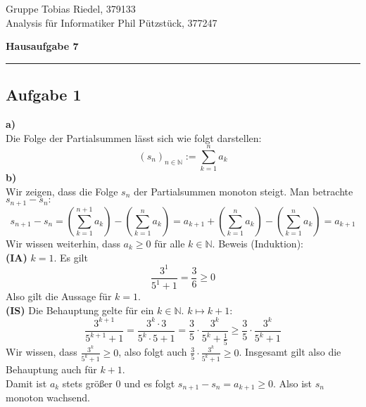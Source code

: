 \documentclass[a4paper,graphics,11pt]{article}
\newcommand{\aufgabe}[1]{\subsection*{Aufgabe #1}}
\begin{document}
\noindent Gruppe              \hfill Tobias Riedel, 379133 \\
\noindent Analysis für Informatiker             \hfill Phil Pützstück, 377247 \\

\begin{center}
	\LARGE{\textbf{Hausaufgabe 7}}
\end{center}
\begin{center}
\rule[0.1ex]{\textwidth}{1pt}
\end{center}



\aufgabe{1}
\textbf{a)}\\[5pt]
Die Folge der Partialsummen lässt sich wie folgt darstellen:
$$
    (s_n)_{n\in \mathbb{N}} := \sum_{k=1}^{n} a_k
$$
\textbf{b)}\\[5pt]
Wir zeigen, dass die Folge $s_n$ der Partialsummen monoton steigt.
Man betrachte $s_{n+1}-s_n\colon$
$$
    s_{n+1} - s_n = \left(\sum_{k=1}^{n+1} a_k\right) - \left(\sum_{k=1}^{n} a_k\right)
    = a_{k+1} + \left(\sum_{k=1}^{n} a_k\right) -\left(\sum_{k=1}^{n} a_k\right)
    = a_{k+1}
$$
Wir wissen weiterhin, dass $a_k \geq 0$ für alle $k \in \mathbb{N}$. Beweis (Induktion):\\
\textbf{(IA)} $k=1$. Es gilt 
$$
    \frac{3^1}{5^1+1} = \frac{3}{6} \geq 0
$$
Also gilt die Aussage für $k=1$.\\
\textbf{(IS)} Die Behauptung gelte für ein $k \in \mathbb{N}$. $k\mapsto k+1\colon$
$$
    \frac{3^{k+1}}{5^{k+1}+1} = \frac{3^k\cdot3}{5^k\cdot5+1}
    = \frac{3}{5}\cdot \frac{3^k}{5^k+\frac{1}{5}}
    \geq \frac{3}{5}\cdot \frac{3^k}{5^k+1}
$$
Wir wissen, dass $\displaystyle\frac{3^k}{5^k+1}\geq 0$, also folgt auch
$\displaystyle\frac{3}{5} \cdot \frac{3^k}{5^k+1} \geq 0$.
Insgesamt gilt also die Behauptung auch für $k+1$.\\
Damit ist $a_k$ stets größer 0 und es folgt $s_{n+1}-s_n = a_{k+1} \geq 0$. Also
ist $s_n$ monoton wachsend.
\end{document}
